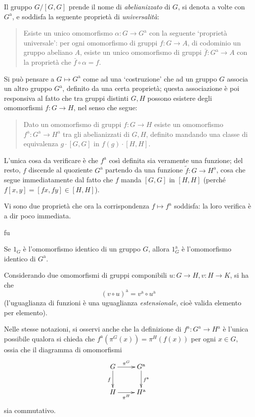 Il gruppo \(G/[G,G]\) prende il nome di \emph{abelianizzato} di \(G\), si denota a volte con \(G^\text{a}\), e soddisfa la seguente proprietà di \emph{universalità}:
\begin{quote}
Esiste un unico omomorfismo \(\alpha : G \to G^\text{a}\) con la seguente `proprietà universale': per ogni omomorfismo di gruppi \(f : G \to A\), di codominio un gruppo abeliano \(A\), esiste un unico omomorfismo di gruppi \(\bar f : G^\text{a} \to A\) con la proprietà che \(\bar f \circ \alpha = f\).
\end{quote}
\begin{remark}
	Si può pensare a \(G\mapsto G^\text{a}\) come ad una `costruzione' che ad un gruppo \(G\) associa un altro gruppo \(G^\text{a}\), definito da una certa proprietà; questa associazione è poi responsiva al fatto che tra gruppi distinti \(G,H\) possono esistere degli omomorfismi \(f : G \to H\), nel senso che segue:
	\begin{quote}
		Dato un omomorfismo di gruppi \(f : G \to H\) esiste un omomorfismo \(f^\text{a} : G^\text{a} \to H^\text{a}\) tra gli abelianizzati di \(G,H\), definito mandando una classe di equivalenza \(g\cdot [G,G]\) in \(f(g)\cdot [H,H]\).
	\end{quote}
	L'unica cosa da verificare è che \(f^\text{a}\) così definita sia veramente una funzione; del resto, \(f\) discende al quoziente $G^\text{a}$ partendo da una funzione $\tilde f : G\to H^\text{a}$, cosa che segue immediatamente dal fatto che $f$ manda \([G,G]\) in \([H,H]\) (perché \(f[x,y]=[fx, fy]\in [H,H]\)).
\end{remark}
Vi sono due proprietà che ora la corrispondenza $f\mapsto f^\text{a}$ soddisfa: la loro verifica è a dir poco immediata.
\begin{enumtag}{fu}
	\item \label{fct_1} Se $1_G$ è l'omomorfismo identico di un gruppo $G$, allora $1_G^\text{a}$ è l'omomorfismo identico di $G^\text{a}$.
	\item \label{fct_2} Considerando due omomorfismi di gruppi componibili $u : G\to H, v : H\to K$, si ha che
	\[(v\circ u)^\text{a} = v^\text{a} \circ u^\text{a}\]
	(l'uguaglianza di funzioni è una uguaglianza \emph{estensionale}, cioè valida elemento per elemento).
\end{enumtag}
Nelle stesse notazioni, si osservi anche che la definizione di \(f^\text{a} : G^\text{a} \to H^\text{a}\) è l'unica possibile qualora si chieda che $f^\text{a}(\pi^G(x)) = \pi^H(f(x))$ per ogni $x\in G$, ossia che il diagramma di omomorfismi
\[\xymatrix{
	G \ar[r]^-{\pi^G} \ar[d]_f & G^\text{a}\ar[d]^{f^\text{a}} \\
	H \ar[r]_-{\pi^H} & H^\text{a}
}\]
sia commutativo.

